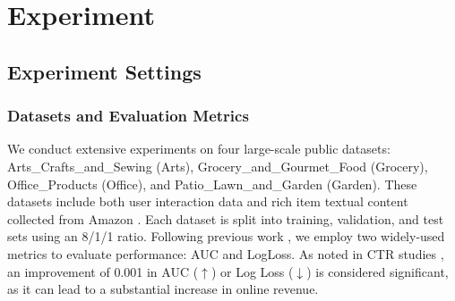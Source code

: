\chapter{Experiment} %

\label{ChapterX} %


\section{Experiment Settings}

\subsection{Datasets and Evaluation Metrics}
\sloppy
We conduct extensive experiments on four large-scale public datasets: Arts\_Crafts\_and\_Sewing (Arts), Grocery\_and\_Gourmet\_Food (Grocery), Office\_Products (Office), and Patio\_Lawn\_and\_Garden (Garden). These datasets include both user interaction data and rich item textual content collected from Amazon \cite{ni2019justifying}. Each dataset is split into training, validation, and test sets using an 8/1/1 ratio. Following previous work \cite{guo2024embedding,li2023ctrl,tian2023eulernet,zhang2024towards}, we employ two widely-used metrics to evaluate performance: AUC and LogLoss. As noted in CTR studies \cite{guo2024embedding,li2023ctrl,tian2023eulernet,zhang2024towards}, an improvement of 0.001 in AUC (\(\uparrow\)) or Log Loss (\(\downarrow\)) is considered significant, as it can lead to a substantial increase in online revenue.

